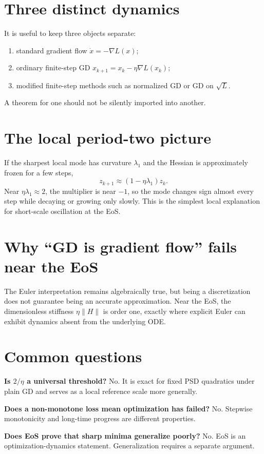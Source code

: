 \documentclass[11pt,a4paper,oneside,openany]{memoir}
\theoremstyle{definition}
\begin{document}
\section{Three distinct dynamics}
It is useful to keep three objects separate:
\begin{enumerate}
\item standard gradient flow $\dot x=-\nabla L(x)$;
\item ordinary finite-step GD $x_{k+1}=x_k-\eta\nabla L(x_k)$;
\item modified finite-step methods such as normalized GD or GD on $\sqrt L$.
\end{enumerate}
A theorem for one should not be silently imported into another.

\section{The local period-two picture}
If the sharpest local mode has curvature $\lambda_1$ and the Hessian is approximately frozen for a few steps,
\[
z_{k+1}\approx(1-\eta\lambda_1)z_k.
\]
Near $\eta\lambda_1\approx2$, the multiplier is near $-1$, so the mode changes sign almost every step while decaying or growing only slowly.  This is the simplest local explanation for short-scale oscillation at the EoS.

\section{Why ``GD is gradient flow'' fails near the EoS}
The Euler interpretation remains algebraically true, but being a discretization does not guarantee being an accurate approximation.  Near the EoS, the dimensionless stiffness $\eta\|H\|$ is order one, exactly where explicit Euler can exhibit dynamics absent from the underlying ODE.

\section{Common questions}
\textbf{Is $2/\eta$ a universal threshold?}  No.  It is exact for fixed PSD quadratics under plain GD and serves as a local reference scale more generally.

\textbf{Does a non-monotone loss mean optimization has failed?}  No.  Stepwise monotonicity and long-time progress are different properties.

\textbf{Does EoS prove that sharp minima generalize poorly?}  No.  EoS is an optimization-dynamics statement.  Generalization requires a separate argument.
\end{document}

